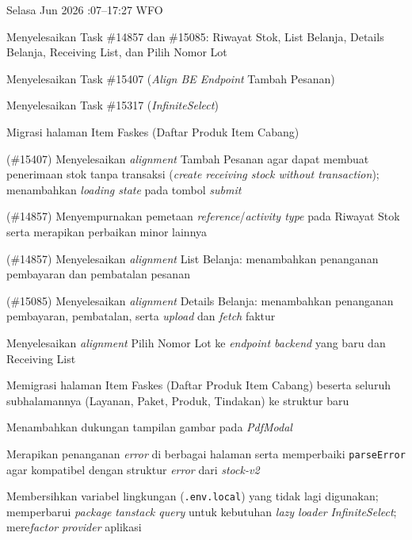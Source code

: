 \begin{logtable}
    {
        Selasa  Jun 2026 :07--17:27 \linebreak %
        WFO
    }{
        \begin{loglist}
            \item Menyelesaikan Task \#14857 dan \#15085: Riwayat Stok, List Belanja, Details
            Belanja, Receiving List, dan Pilih Nomor Lot
            \item Menyelesaikan Task \#15407 (\textit{Align BE Endpoint} Tambah Pesanan)
            \item Menyelesaikan Task \#15317 (\textit{InfiniteSelect})
            \item Migrasi halaman Item Faskes (Daftar Produk Item Cabang)
        \end{loglist}
    }{
        \begin{logwork}
            \item (\#15407) Menyelesaikan \textit{alignment} Tambah Pesanan agar dapat membuat penerimaan stok tanpa transaksi (\textit{create receiving stock without transaction}); menambahkan \textit{loading state} pada tombol \textit{submit}
            \item (\#14857) Menyempurnakan pemetaan \textit{reference}/\textit{activity type} pada Riwayat Stok serta merapikan perbaikan minor lainnya
            \item (\#14857) Menyelesaikan \textit{alignment} List Belanja: menambahkan penanganan pembayaran dan pembatalan pesanan
            \item (\#15085) Menyelesaikan \textit{alignment} Details Belanja: menambahkan penanganan pembayaran, pembatalan, serta \textit{upload} dan \textit{fetch} faktur
            \item Menyelesaikan \textit{alignment} Pilih Nomor Lot ke \textit{endpoint backend}
            yang baru dan Receiving List
            \item Memigrasi halaman Item Faskes (Daftar Produk Item Cabang) beserta seluruh
            subhalamannya (Layanan, Paket, Produk, Tindakan) ke struktur baru
            \item Menambahkan dukungan tampilan gambar pada \textit{PdfModal}
            \item Merapikan penanganan \textit{error} di berbagai halaman serta memperbaiki
            \texttt{parseError} agar kompatibel dengan struktur \textit{error} dari
            \textit{stock-v2}
            \item Membersihkan variabel lingkungan (\texttt{.env.local}) yang tidak lagi
            digunakan; memperbarui \textit{package} \textit{tanstack query} untuk kebutuhan
            \textit{lazy loader} \textit{InfiniteSelect}; mere\textit{factor}
            \textit{provider} aplikasi
        \end{logwork}
    }


\end{logtable}
